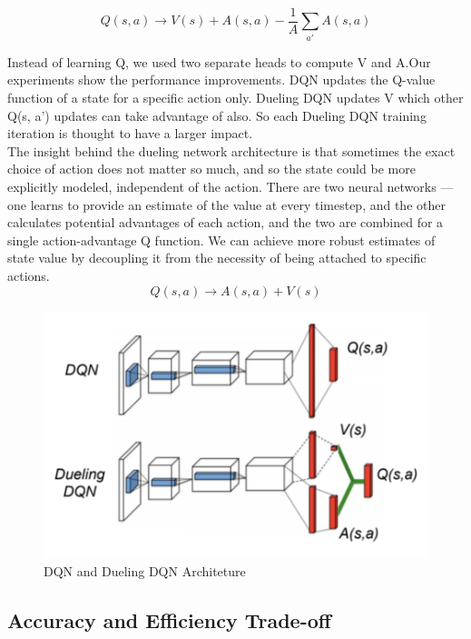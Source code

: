 \begin{equation}
Q(s,a) \rightarrow V(s) + A(s,a) -\frac{1}{A} \sum_{a'}^{} A(s,a )
\end{equation}

Instead of learning Q, we used two separate heads to compute V and A.Our experiments show the performance improvements. DQN updates the Q-value function of a state for a specific action only. Dueling DQN updates V which other Q(s, a’) updates can take advantage of also. So each Dueling DQN training iteration is thought to have a larger impact.
\\
The insight behind the dueling network architecture is that sometimes the exact choice of action does not matter so much, and so the state could be more explicitly modeled, independent of the action. There are two neural networks — one learns to provide an estimate of the value at every timestep, and the other calculates potential advantages of each action, and the two are combined for a single action-advantage Q function. We can achieve more robust estimates of state value by decoupling it from the necessity of being attached to specific actions.\citep{Dueling}
\newline
\begin{equation}
Q(s,a) \rightarrow A(s,a) + V(s)
\end{equation}
\newline 

\begin{figure}[!ht]
\includegraphics[scale=0.50,width=0.50\columnwidth]{figures/DuelingArch.png}%
\caption{ DQN and Dueling DQN Architeture\citep{Dueling_Diagram}}%
\label{fig:Dueling and DQN Architecture}%
\end{figure}

\subsection{Accuracy and Efficiency Trade-off}

